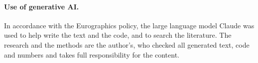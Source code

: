 \documentclass{egpubl}
\theoremstyle{definition}
\begin{document}
\paragraph*{Use of generative AI.} In accordance with the Eurographics policy,
the large language model Claude was used to help write the text
and the code, and to search the literature. The research and the methods are
the author's, who checked all generated text, code and numbers and takes full
responsibility for the content.



\end{document}
